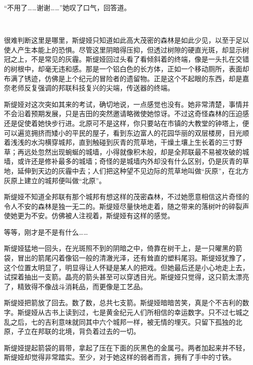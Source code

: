 \documentclass[a5paper, punct=kaiming, fontset=none]{ctexart}
\newcommand{\emptypar}{\ }
\begin{document}
“不用了……谢谢……”她叹了口气，回答道。

\emptypar

很难判断这里是哪里，斯缇娅只知道如此高大茂密的森林是如此少见，以至于足以使人产生本能上的恐惧。尽管这里阴暗得压抑，但透过树隙的硬直光斑，却显示树冠之上，不是常见的灰霾。斯缇娅回过头看了看倾斜着的终端，像是一头扎在交错的树根中，却毫无违和感。那是一个铝白色的长方体，正如一个移动厕所，表面却布满了锈迹，仿佛是上个纪元的冒险者的遗留物。正是这个不起眼的东西，却是嘉奈老师反复强调的邦联科技复兴的尖端，传送器的终端。

斯缇娅对这次突如其来的考试，确切地说，一点感觉也没有。她非常清楚，事情并不会沿着预期发展，只是吉田的突然邀请略微使她惊讶。不过这奇怪森林的压迫感还是促使着她快步行进。北原可不是这样，你只要站在市镇的大教堂的钟塔上，便可以遍览拥挤而矮小的平民的屋子，看到东边富人的花园华丽的双层楼房，目光顺着浅浅的水沟横穿城邦，直到触碰到灰青的荒草地，干燥土壤上生长着的三寸野草；再远处忽然出现蜿蜒的城墙，小得就像积木般，却是全邦联最不易被攻破的城墙，或许还是修补最多的城墙；奇怪的是城墙内外却没有什么区别，仍是灰青的草地，延伸到天边的灰霾中去；人们把这种望不见边际的荒草地叫做“灰原”，在北方灰原上建立的城邦便叫做“北原”。

斯缇娅不知道全邦联有那个城邦有想这样的茂密森林，不过她愿意相信这片奇怪的令人不安的森林是独一无二的。斯缇娅尽量快地走着，随之带来的落树叶的碎裂声使她更为不安。仿佛被人注视着，斯缇娅有这样的感觉。

等等，刚才是不是有什么……

斯缇娅猛地一回头，在光斑照不到的阴暗之中，倚靠在树干上，是一只曜黑的箭袋，冒出的箭尾闪着像铝一般的清澈光泽，还有耸直的塑料尾羽。斯缇娅犹豫了，这个位置太明显了，明显得让人怀疑是某人的把戏。但她最后还是小心地走上去，试探着抽出一支箭。晶亮的箭头甚至可以穿透目光。斯缇娅只觉得，这只箭太漂亮了，精致得不像战斗消耗品，而更像是工艺品。

斯缇娅把箭放了回去。数了数，总共七支箭。斯缇娅暗暗苦笑，真是个不吉利的数字。斯缇娅从古书上读到过，七是黄金纪元人们所相信的幸运数字。只不过七城之乱之后，七的吉利意味就同其中六个城邦一样，被无情的埋灭。只留下孤独的北原，孑立在邦联的北境，背负着过去的一切。

斯缇娅提起箭袋的肩带，拿起了压在下面的灰黑色的金属弓。两者加起来并不轻，斯缇娅却觉得非常踏实。至少，对于她这样的弱者而言，拥有了手中的寸铁。
\end{document}
